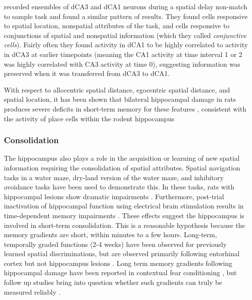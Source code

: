 \documentclass[doc, longtable]{apa6}
\begin{document}
\textcite{Hampson1993a} recorded ensembles of dCA3 and dCA1 neurons during a spatial delay non-match to sample task and found a similar pattern of results. They found cells responsive to spatial location, nonspatial attributes of the task, and cells responsive to conjunctions of spatial and nonspatial information (which they called \textit{conjunctive cells}). Fairly often they found activity in dCA1 to be highly correlated to activity in dCA3 at earlier timepoints (meaning the CA1 activity at time interval 1 or 2 was highly correlated with CA3 activity at time 0), suggesting information was preserved when it was transferred from dCA3 to dCA1. 

With respect to allocentric spatial distance, egocentric spatial distance, and spatial location, it has been shown that bilateral hippocampal damage in rats produces severe deficits in short-term memory for these features \parencite{Long1996a}, consistent with the activity of place cells within the rodent hippocampus \parencite{Kesner1990c, Olton1983a, Olton1986a, Lee2003, Kesner2011a, OKeefe1978a}

\subsubsection{Consolidation}
The hippocampus also plays a role in the acquisition or learning of new spatial information requiring the consolidation of spatial attributes. Spatial navigation tasks in a water maze, dry-land version of the water maze, and inhibitory avoidance tasks have been used to demonstrate this. In these tasks, rats with hippocampal lesions show dramatic impairments \parencite{OKeefe1978a, Morris1982a, Kesner1990c}. Furthermore, post-trial inactivation of hippocampal function using electrical brain stimulation results in time-dependent memory impairments \parencite{Kesner1974a}. These effects suggest the hippocampus is involved in short-term consolidation. This is a reasonable hypothesis because the memory gradients are short, within minutes to a few hours. Long-term, temporally graded functions (2-4 weeks) have been observed for previously learned spatial discriminations, but are observed primarily following entorhinal cortex but not hippocampus lesions \parencite{Cho1995b, Cho1995c}. Long term memory gradients following hippocampal damage have been reported in contextual fear conditioning \parencite{Kim1992a}, but follow up studies bring into question whether such gradients can truly be measured reliably \parencite{Maren1996a, Weisend1996a}. 	
\end{document}
